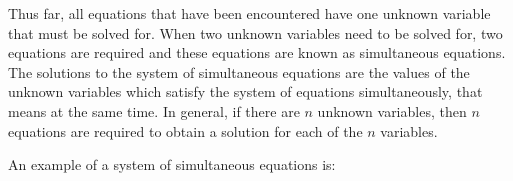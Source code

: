       
\label{m39257*id158940}Thus far, all equations that have been encountered have one unknown variable that must be solved for. When two unknown variables need to be solved for, two equations are required and these equations are known as simultaneous equations. The solutions to the system of simultaneous equations are the values of the unknown variables which satisfy the system of equations simultaneously, that means at the same time. In general, if there are \begin{math}n\end{math} unknown variables, then \begin{math}n\end{math} equations are required to obtain a solution for each of the \begin{math}n\end{math} variables.\par 
      \label{m39257*id158974}An example of a system of simultaneous equations is:\par 
      \label{m39257*uid92}\nopagebreak\noindent{}
    
